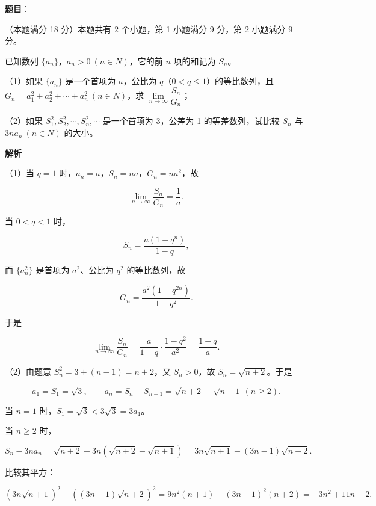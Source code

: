 \begin{answer}

\textbf{题目}：

（本题满分 18 分）本题共有 2 个小题，第 1 小题满分 9 分，第 2 小题满分 9 分。

已知数列 $\{a_{n}\}$，$a_{n}>0\ (n\in N)$，它的前 $n$ 项的和记为 $S_{n}$。

（1）如果 $\{a_{n}\}$ 是一个首项为 $a$，公比为 $q$（$0<q\le 1$）的等比数列，且 $G_{n}=a_{1}^{2}+a_{2}^{2}+\cdots+a_{n}^{2}\ (n\in N)$，求 $\lim\limits_{n\to\infty}\dfrac{S_{n}}{G_{n}}$；

（2）如果 $S_{1}^{2},S_{2}^{2},\cdots,S_{n}^{2},\cdots$ 是一个首项为 3，公差为 1 的等差数列，试比较 $S_{n}$ 与 $3na_{n}\ (n\in N)$ 的大小。

\textbf{解析}

（1）当 $q=1$ 时，$a_{n}=a$，$S_{n}=na$，$G_{n}=na^{2}$，故

\nopagebreak[4]
\[
\lim_{n\to\infty}\frac{S_{n}}{G_{n}}=\frac{1}{a}.
\]

当 $0<q<1$ 时，

\nopagebreak[4]
\[
S_{n}=\frac{a(1-q^{n})}{1-q},
\]

而 $\{a_{n}^{2}\}$ 是首项为 $a^{2}$、公比为 $q^{2}$ 的等比数列，故

\nopagebreak[4]
\[
G_{n}=\frac{a^{2}(1-q^{2n})}{1-q^{2}}.
\]

于是

\nopagebreak[4]
\[
\lim_{n\to\infty}\frac{S_{n}}{G_{n}}
=\frac{a}{1-q}\cdot\frac{1-q^{2}}{a^{2}}
=\frac{1+q}{a}.
\]

（2）由题意 $S_{n}^{2}=3+(n-1)=n+2$，又 $S_{n}>0$，故 $S_{n}=\sqrt{n+2}$。于是

\nopagebreak[4]
\[
a_{1}=S_{1}=\sqrt{3},\qquad
a_{n}=S_{n}-S_{n-1}=\sqrt{n+2}-\sqrt{n+1}\ (n\ge 2).
\]

当 $n=1$ 时，$S_{1}=\sqrt{3}<3\sqrt{3}=3a_{1}$。

当 $n\ge 2$ 时，

\nopagebreak[4]
\[
S_{n}-3na_{n}=\sqrt{n+2}-3n\left(\sqrt{n+2}-\sqrt{n+1}\right)
=3n\sqrt{n+1}-(3n-1)\sqrt{n+2}.
\]

比较其平方：

\nopagebreak[4]
\[
\left(3n\sqrt{n+1}\right)^{2}-\left((3n-1)\sqrt{n+2}\right)^{2}
=9n^{2}(n+1)-(3n-1)^{2}(n+2)
=-3n^{2}+11n-2.
\]


\end{answer}
